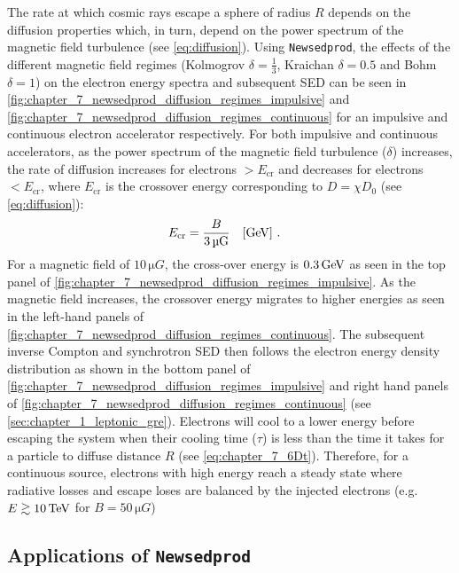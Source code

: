 The rate at which cosmic rays escape a sphere of radius $R$ depends on the diffusion properties which, in turn, depend on the power spectrum of the magnetic field turbulence (see \autoref{eq:diffusion}). Using {\tt Newsedprod}, the effects of the different magnetic field regimes (Kolmogrov $\delta=\frac{1}{3}$, Kraichan $\delta=0.5$ and Bohm $\delta=1$) on the electron energy spectra and subsequent SED can be seen in \autoref{fig:chapter_7_newsedprod_diffusion_regimes_impulsive} and \autoref{fig:chapter_7_newsedprod_diffusion_regimes_continuous} for an impulsive and continuous electron accelerator respectively.
\newpar 
For both impulsive and continuous accelerators, as the power spectrum of the magnetic field turbulence ($\delta$) increases, the rate of diffusion increases for electrons $>E_\text{cr}$ and decreases for electrons $<E_\text{cr}$, where $E_\text{cr}$ is the crossover energy corresponding to $D=\chi D_0$ (see \autoref{eq:diffusion}):
\begin{equation}
    \begin{aligned}
        E_\text{cr}&=\frac{B}{3\,\si{\micro G}}\quad\qty[\GeV]\text{ .}
    \end{aligned}
\end{equation}
\noindent For a magnetic field of $10\,\si{\micro G}$, the cross-over energy is $0.3\,\GeV$ as seen in the top panel of \autoref{fig:chapter_7_newsedprod_diffusion_regimes_impulsive}. As the magnetic field increases, the crossover energy migrates to higher energies as seen in the left-hand panels of \autoref{fig:chapter_7_newsedprod_diffusion_regimes_continuous}. The subsequent inverse Compton and synchrotron SED then follows the electron energy density distribution as shown in the bottom panel of \autoref{fig:chapter_7_newsedprod_diffusion_regimes_impulsive} and right hand panels of \autoref{fig:chapter_7_newsedprod_diffusion_regimes_continuous} (see \autoref{sec:chapter_1_leptonic_gre}).
\newpar 
Electrons will cool to a lower energy before escaping the system when their cooling time ($\tau$) is less than the time it takes for a particle to diffuse distance $R$ (see \autoref{eq:chapter_7_6Dt}). Therefore, for a continuous source, electrons with high energy reach a steady state where radiative losses and escape loses are balanced by the injected electrons (e.g. $E\gtrsim 10\,\TeV$ for $B=50\,\si{\micro G}$)

\subsection{Applications of {\tt Newsedprod}}

